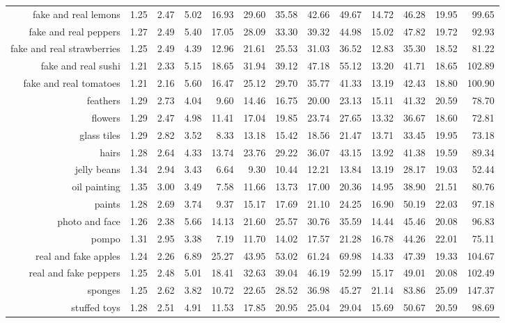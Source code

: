 \begin{landscape}
\begin{table}
\begin{tabularx}{\linewidth}{r | rr | rrrrrr | rrrr}
        fake and real lemons  & 1.25& 2.47& 5.02& 16.93& 29.60& 35.58& 42.66& 49.67& 14.72& 46.28& 19.95& 99.65\\
        fake and real peppers  & 1.27& 2.49& 5.40& 17.05& 28.09& 33.30& 39.32& 44.98& 15.02& 47.82& 19.72& 92.93\\
        fake and real strawberries  & 1.25& 2.49& 4.39& 12.96& 21.61& 25.53& 31.03& 36.52& 12.83& 35.30& 18.52& 81.22\\
        fake and real sushi  & 1.21& 2.33& 5.15& 18.65& 31.94& 39.12& 47.18& 55.12& 13.20& 41.71& 18.65& 102.89\\
        fake and real tomatoes  & 1.21& 2.16& 5.60& 16.47& 25.12& 29.70& 35.77& 41.33& 13.19& 42.43& 18.80& 100.90\\
        feathers  & 1.29& 2.73& 4.04& 9.60& 14.46& 16.75& 20.00& 23.13& 15.11& 41.32& 20.59& 78.70\\
        flowers  & 1.29& 2.47& 4.98& 11.41& 17.04& 19.85& 23.74& 27.65& 13.32& 36.67& 18.60& 72.81\\
        glass tiles  & 1.29& 2.82& 3.52& 8.33& 13.18& 15.42& 18.56& 21.47& 13.71& 33.45& 19.95& 73.18\\
        hairs  & 1.28& 2.64& 4.33& 13.74& 23.76& 29.22& 36.07& 43.15& 13.92& 41.38& 19.59& 89.34\\
        jelly beans  & 1.34& 2.94& 3.43& 6.64& 9.30& 10.44& 12.21& 13.84& 13.19& 28.17& 19.03& 52.44\\
        oil painting  & 1.35& 3.00& 3.49& 7.58& 11.66& 13.73& 17.00& 20.36& 14.95& 38.90& 21.51& 80.76\\
        paints  & 1.28& 2.69& 3.74& 9.37& 15.17& 17.69& 21.10& 24.25& 16.90& 50.19& 22.03& 97.18\\
        photo and face  & 1.26& 2.38& 5.66& 14.13& 21.60& 25.57& 30.76& 35.59& 14.44& 45.46& 20.08& 96.83\\
        pompo   & 1.31& 2.95& 3.38& 7.19& 11.70& 14.02& 17.57& 21.28& 16.78& 44.26& 22.01& 75.11\\
        real and fake apples  & 1.24& 2.26& 6.89& 25.27& 43.95& 53.02& 61.24& 69.98& 14.33& 47.39& 19.33& 104.67\\
        real and fake peppers  & 1.25& 2.48& 5.01& 18.41& 32.63& 39.04& 46.19& 52.99& 15.17& 49.01& 20.08& 102.49\\
        sponges  & 1.25& 2.62& 3.82& 10.72& 22.65& 28.52& 36.98& 45.27& 21.14& 83.86& 25.09& 147.37\\
        stuffed toys  & 1.28& 2.51& 4.91& 11.53& 17.85& 20.95& 25.04& 29.04& 15.69& 50.67& 20.59& 98.69\\

\end{tabularx}
\end{table}
\end{landscape}
